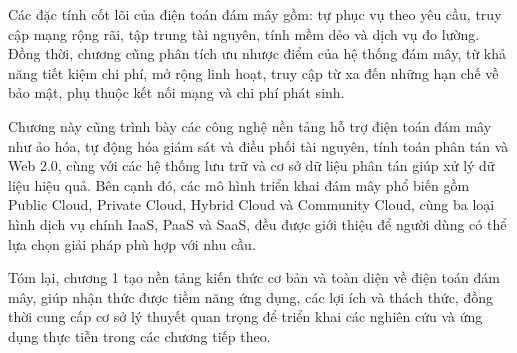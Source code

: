 Các đặc tính cốt lõi của điện toán đám mây gồm: tự phục vụ theo yêu cầu, truy cập mạng rộng rãi, tập trung tài nguyên, tính mềm dẻo và dịch vụ đo lường. Đồng thời, chương cũng phân tích ưu nhược điểm của hệ thống đám mây, từ khả năng tiết kiệm chi phí, mở rộng linh hoạt, truy cập từ xa đến những hạn chế về bảo mật, phụ thuộc kết nối mạng và chi phí phát sinh.

Chương này cũng trình bày các công nghệ nền tảng hỗ trợ điện toán đám mây như ảo hóa, tự động hóa giám sát và điều phối tài nguyên, tính toán phân tán và Web 2.0, cùng với các hệ thống lưu trữ và cơ sở dữ liệu phân tán giúp xử lý dữ liệu hiệu quả. Bên cạnh đó, các mô hình triển khai đám mây phổ biến gồm Public Cloud, Private Cloud, Hybrid Cloud và Community Cloud, cùng ba loại hình dịch vụ chính IaaS, PaaS và SaaS, đều được giới thiệu để người dùng có thể lựa chọn giải pháp phù hợp với nhu cầu.

Tóm lại, chương 1 tạo nền tảng kiến thức cơ bản và toàn diện về điện toán đám mây, giúp nhận thức được tiềm năng ứng dụng, các lợi ích và thách thức, đồng thời cung cấp cơ sở lý thuyết quan trọng để triển khai các nghiên cứu và ứng dụng thực tiễn trong các chương tiếp theo.